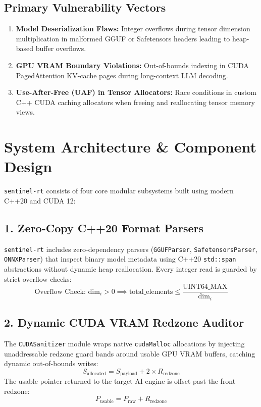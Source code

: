 \documentclass[11pt,a4paper]{article}
\begin{document}
\subsection{Primary Vulnerability Vectors}
\begin{enumerate}
    \item \textbf{Model Deserialization Flaws:} Integer overflows during tensor dimension multiplication in malformed GGUF or Safetensors headers leading to heap-based buffer overflows.
    \item \textbf{GPU VRAM Boundary Violations:} Out-of-bounds indexing in CUDA PagedAttention KV-cache pages during long-context LLM decoding.
    \item \textbf{Use-After-Free (UAF) in Tensor Allocators:} Race conditions in custom C++ CUDA caching allocators when freeing and reallocating tensor memory views.
\end{enumerate}

\section{System Architecture \& Component Design}

\texttt{sentinel-rt} consists of four core modular subsystems built using modern C++20 and CUDA 12:

\subsection{1. Zero-Copy C++20 Format Parsers}
\texttt{sentinel-rt} includes zero-dependency parsers (\texttt{GGUFParser}, \texttt{SafetensorsParser}, \texttt{ONNXParser}) that inspect binary model metadata using C++20 \texttt{std::span} abstractions without dynamic heap reallocation. Every integer read is guarded by strict overflow checks:
\begin{equation}
\text{Overflow Check: } \text{dim}_i > 0 \implies \text{total\_elements} \le \frac{\text{UINT64\_MAX}}{\text{dim}_i}
\end{equation}

\subsection{2. Dynamic CUDA VRAM Redzone Auditor}
The \texttt{CUDASanitizer} module wraps native \texttt{cudaMalloc} allocations by injecting unaddressable redzone guard bands around usable GPU VRAM buffers, catching dynamic out-of-bounds writes:
\begin{equation}
S_{\text{allocated}} = S_{\text{payload}} + 2 \times R_{\text{redzone}}
\end{equation}
The usable pointer returned to the target AI engine is offset past the front redzone:
\begin{equation}
P_{\text{usable}} = P_{\text{raw}} + R_{\text{redzone}}
\end{equation}
\end{document}
